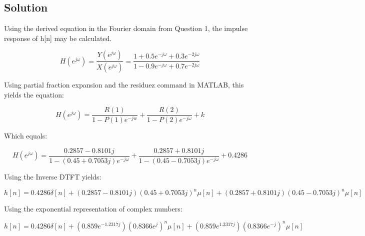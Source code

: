 \documentclass{article}
\begin{document}
\subsection*{Solution}

\begin{par}
Using the derived equation in the Fourier domain from Question 1, the impulse response of h[n] may be calculated.
\end{par} \vspace{1em}
\begin{par}
$$H(e^{j\omega}) = \frac{Y(e^{j\omega})}{X(e^{j\omega})} =
\frac{1 + 0.5e^{-j\omega} + 0.3e^{-2j\omega}}
{1 - 0.9e^{-j\omega} + 0.7e^{-2j\omega}}$$
\end{par} \vspace{1em}
\begin{par}
Using partial fraction expansion and the residuez command in MATLAB, this yields the equation:
\end{par} \vspace{1em}
\begin{par}
$$H(e^{j\omega}) = \frac{R(1)}{1-P(1)e^{-jw}} + \frac{R(2)}{1-P(2)e^{-j\omega}} +
k$$
\end{par} \vspace{1em}
\begin{par}
Which equals:
\end{par} \vspace{1em}
\begin{par}
$$H(e^{j\omega}) = \frac{0.2857 - 0.8101j}{1- (0.45 + 0.7053j)e^{-j\omega}} +
\frac{0.2857 + 0.8101j}{1 - (0.45 - 0.7053j)e^{-j\omega}} + 0.4286$$
\end{par} \vspace{1em}
\begin{par}
Using the Inverse DTFT yields:
\end{par} \vspace{1em}
\begin{par}
$$h[n] = 0.4286\delta[n] + (0.2857 - 0.8101j)(0.45 + 0.7053j)^{n}\mu[n] +
(0.2857 + 0.8101j)(0.45 - 0.7053j)^{n}\mu[n]$$
\end{par} \vspace{1em}
\begin{par}
Using the exponential representation of complex numbers:
\end{par} \vspace{1em}
\begin{par}
$$h[n] = 0.4286\delta[n] + (0.859e^{-1.2317j})(0.8366e^{j})^{n}\mu[n] +
(0.859e^{1.2317j})(0.8366e^{-j})^{n}\mu[n]$$
\end{par} \vspace{1em}
\end{document}
